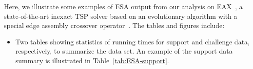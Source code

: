 \documentclass[aic]{iosart2x}
\begin{document}
\label{sec:ESA-Output}

 Here, we illustrate some examples of ESA output from our analysis on EAX~\cite{NagKob13}, a state-of-the-art inexact TSP solver based on an evolutionary algorithm with a special edge assembly crossover operator~\cite{Nag97}. The tables and figures include:
\begin{itemize}
\item Two tables showing statistics of running times for support and challenge data, respectively, to summarize the data set. An example of the support data summary is illustrated in Table~\ref{tab:ESA-support}.
\begin{table}[t]
\caption{Support data example} \label{tab:ESA-support}
\begin{centering}
\medskip{}
\par
\end{centering}
\end{table}


\end{itemize}
\end{document}
